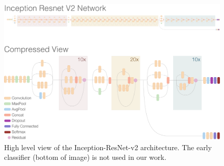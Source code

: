 \documentclass[12pt]{article}
\numberwithin{equation}{section}
\numberwithin{figure}{section}
\begin{document}
\begin{figure}[H]
	\centering
	\captionsetup{justification=centering}
	\includegraphics[scale=0.25]{inception_resnetv2.png}
	\caption{High level view of the Inception-ResNet-v2 architecture. The early classifier (bottom of image) is not used in our work.}
	\label{fig:incepresnetv2}
\end{figure}
\end{document}
